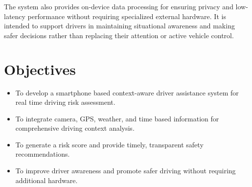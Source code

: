 The system also provides on-device data processing for ensuring privacy and low-latency performance without requiring specialized external hardware. It is intended to support drivers in maintaining situational awareness and making safer decisions rather than replacing their attention or active vehicle control.

\section{Objectives}

\begin{itemize}
    \item To develop a smartphone based context-aware driver assistance system for real time driving risk assessment.
    \item To integrate camera, GPS, weather, and time based information for comprehensive driving context analysis.
    \item To generate a risk score and provide timely, transparent safety recommendations.
    \item To improve driver awareness and promote safer driving without requiring additional hardware.
\end{itemize}